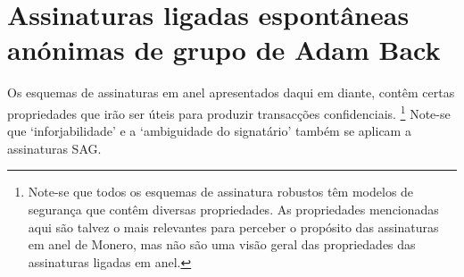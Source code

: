 \section{Assinaturas ligadas espontâneas anónimas de grupo de Adam Back}

\label{blsag_note}

Os esquemas de assinaturas em anel apresentados daqui em diante, contêm certas propriedades que irão ser úteis para produzir transacções confidenciais.
\footnote{Note-se que todos os esquemas de assinatura robustos têm modelos de segurança que contêm diversas propriedades. As propriedades mencionadas aqui são talvez o mais relevantes para perceber o propósito das assinaturas em anel de Monero, mas não são uma visão geral das propriedades das assinaturas ligadas em anel.}
Note-se que `inforjabilidade' e a `ambiguidade do signatário' também se aplicam a assinaturas SAG.

